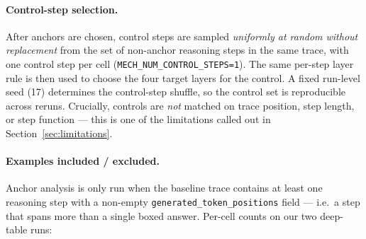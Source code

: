 \documentclass{article}
\theoremstyle{plain}
\theoremstyle{definition}
\theoremstyle{remark}
\begin{document}
\paragraph{Control-step selection.}
After anchors are chosen, control steps are sampled \emph{uniformly
at random without replacement} from the set of non-anchor reasoning
steps in the same trace, with one control step per cell
(\texttt{MECH\_NUM\_CONTROL\_STEPS=1}). The same per-step layer rule
is then used to choose the four target layers for the control. A
fixed run-level seed (17) determines the control-step shuffle, so the
control set is reproducible across reruns. Crucially, controls are
\emph{not} matched on trace position, step length, or step function
--- this is one of the limitations called out in
Section~\ref{sec:limitations}.

\paragraph{Examples included / excluded.}
Anchor analysis is only run when the baseline trace contains at
least one reasoning step with a non-empty
\texttt{generated\_token\_positions} field --- i.e.\ a step that
spans more than a single boxed answer. Per-cell counts on our two
deep-table runs:
\end{document}
